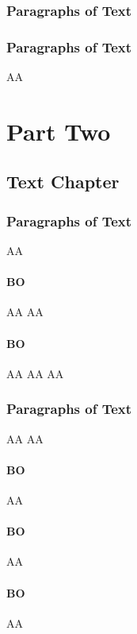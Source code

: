\documentclass[11pt,fleqn]{book}
\begin{document}
\section{Paragraphs of Text}
\section{Paragraphs of Text}
AA



\part{Part Two}



\chapter{Text Chapter}

\section{Paragraphs of Text}
AA

\subsection{BO}
AA
AA
\subsection{BO}
AA
AA
AA
\section{Paragraphs of Text}
AA
AA

\subsection{BO}
AA
\subsection{BO}
AA
\subsection{BO}
AA
\end{document}
